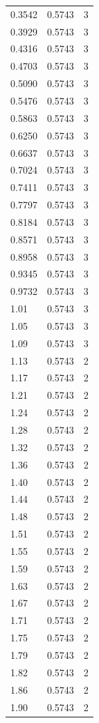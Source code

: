 \begin{longtable}{lrr}
  0.3542 & 0.5743 & 3 \\
  0.3929 & 0.5743 & 3 \\
  0.4316 & 0.5743 & 3 \\
  0.4703 & 0.5743 & 3 \\
  0.5090 & 0.5743 & 3 \\
  0.5476 & 0.5743 & 3 \\
  0.5863 & 0.5743 & 3 \\
  0.6250 & 0.5743 & 3 \\
  0.6637 & 0.5743 & 3 \\
  0.7024 & 0.5743 & 3 \\
  0.7411 & 0.5743 & 3 \\
  0.7797 & 0.5743 & 3 \\
  0.8184 & 0.5743 & 3 \\
  0.8571 & 0.5743 & 3 \\
  0.8958 & 0.5743 & 3 \\
  0.9345 & 0.5743 & 3 \\
  0.9732 & 0.5743 & 3 \\
  1.01 & 0.5743 & 3 \\
  1.05 & 0.5743 & 3 \\
  1.09 & 0.5743 & 3 \\
  1.13 & 0.5743 & 2 \\
  1.17 & 0.5743 & 2 \\
  1.21 & 0.5743 & 2 \\
  1.24 & 0.5743 & 2 \\
  1.28 & 0.5743 & 2 \\
  1.32 & 0.5743 & 2 \\
  1.36 & 0.5743 & 2 \\
  1.40 & 0.5743 & 2 \\
  1.44 & 0.5743 & 2 \\
  1.48 & 0.5743 & 2 \\
  1.51 & 0.5743 & 2 \\
  1.55 & 0.5743 & 2 \\
  1.59 & 0.5743 & 2 \\
  1.63 & 0.5743 & 2 \\
  1.67 & 0.5743 & 2 \\
  1.71 & 0.5743 & 2 \\
  1.75 & 0.5743 & 2 \\
  1.79 & 0.5743 & 2 \\
  1.82 & 0.5743 & 2 \\
  1.86 & 0.5743 & 2 \\
  1.90 & 0.5743 & 2 \\

\end{longtable}
